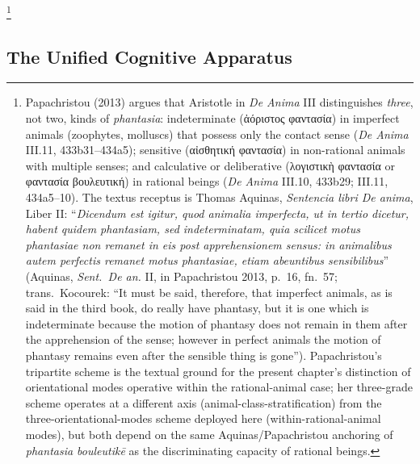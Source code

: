 \documentclass{article}
\newcommand{\gk}[1]{{\greekfont #1}}
\begin{document}
\footnote{Papachristou (2013) argues that Aristotle in \textit{De Anima} III distinguishes \textit{three}, not two, kinds of \textit{phantasia}: indeterminate (\gk{ἀόριστος φαντασία}) in imperfect animals (zoophytes, molluscs) that possess only the contact sense (\textit{De Anima} III.11, 433b31--434a5); sensitive (\gk{αἰσθητική φαντασία}) in non-rational animals with multiple senses; and calculative or deliberative (\gk{λογιστικὴ φαντασία} or \gk{φαντασία βουλευτική}) in rational beings (\textit{De Anima} III.10, 433b29; III.11, 434a5--10). The textus receptus is Thomas Aquinas, \textit{Sentencia libri De anima}, Liber II: ``\textit{Dicendum est igitur, quod animalia imperfecta, ut in tertio dicetur, habent quidem phantasiam, sed indeterminatam, quia scilicet motus phantasiae non remanet in eis post apprehensionem sensus: in animalibus autem perfectis remanet motus phantasiae, etiam abeuntibus sensibilibus}'' (Aquinas, \textit{Sent.\ De an.} II, in Papachristou 2013, p.~16, fn.~57; trans.\ Kocourek: ``It must be said, therefore, that imperfect animals, as is said in the third book, do really have phantasy, but it is one which is indeterminate because the motion of phantasy does not remain in them after the apprehension of the sense; however in perfect animals the motion of phantasy remains even after the sensible thing is gone''). Papachristou's tripartite scheme is the textual ground for the present chapter's distinction of orientational modes operative within the rational-animal case; her three-grade scheme operates at a different axis (animal-class-stratification) from the three-orientational-modes scheme deployed here (within-rational-animal modes), but both depend on the same Aquinas/Papachristou anchoring of \textit{phantasia bouleutik\=e} as the discriminating capacity of rational beings.}

\subsection{The Unified Cognitive Apparatus}
\end{document}

